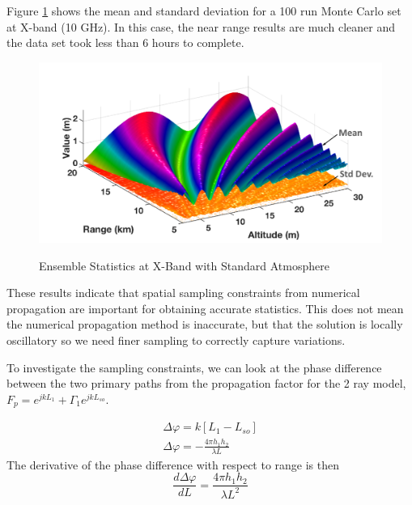 Figure \ref{stat_fig:2} shows the mean and standard deviation for a 100 run Monte Carlo set at X-band (10 GHz). In this case, the near range results are much cleaner and the data set took less than 6 hours to complete.
\begin{figure}[H]
  \begin{center}
\includegraphics[width=5in]{../media/statistics/x_band_stats.png}
  \end{center}
  \renewcommand{\baselinestretch}{1} \small\normalsize
  \begin{quote}
    \caption[Ensemble Statistics at X-Band with Standard Atmosphere]{Ensemble Statistics at X-Band with Standard Atmosphere\label{stat_fig:2}}
  \end{quote}
\end{figure}
\renewcommand{\baselinestretch}{2} \small\normalsize

These results indicate that spatial sampling constraints from numerical propagation are important for obtaining accurate statistics. This does not mean the numerical propagation method is inaccurate, but that the solution is locally oscillatory so we need finer sampling to correctly capture variations.

To investigate the sampling constraints, we can look at the phase difference between the two primary paths from the propagation factor for the 2 ray model, $F_p = e^{jkL_1} + \Gamma_1e^{jkL_{so}}$. 

\begin{equation}
\begin{gathered}
\Delta\varphi = k\left[ L_1 - L_{so}\right] \\
\Delta\varphi = -\frac{4\pi h_1h_2}{\lambda L}
\label{stat_eq:1}
\end{gathered}
\end{equation}
\renewcommand{\baselinestretch}{2} \small\normalsize
The derivative of the phase difference with respect to range is then
\begin{equation}
\frac{d\Delta\varphi}{dL}=\frac{4\pi h_1h_2}{\lambda L^2}
\label{stat_eq:2}
\end{equation}
\renewcommand{\baselinestretch}{2} \small\normalsize

